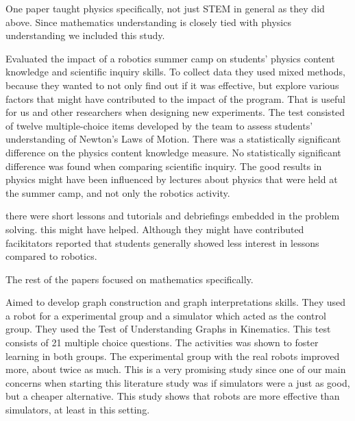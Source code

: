 \bigskip\noindent
One paper taught physics specifically, not just STEM in general as they did above. Since mathematics understanding is closely tied with physics understanding we included this study.

\bigskip\noindent
\cite{williams2007acquisition} Evaluated the impact of a robotics summer camp on students’ physics content knowledge and scientific inquiry skills. To collect data they used mixed methods, because they wanted to not only find out if it was effective, but explore various factors that might have contributed to the impact of the program. That is useful for us and other researchers when designing new experiments. The test consisted of twelve multiple-choice items developed by the team to assess students’ understanding of Newton’s Laws of Motion. There was a statistically significant difference on the physics content knowledge measure. No statistically significant difference was found when comparing scientific inquiry. The good results in physics might have been influenced by lectures about physics that were held at the summer camp, and not only the robotics activity. 

\bigskip\noindent
\cite{williams2007acquisition} there were short lessons and tutorials and debriefings embedded in the problem solving. this might have helped. Although they might have contributed facikitators reported that students generally showed less interest in lessons compared to robotics. 

\bigskip\noindent
The rest of the papers focused on mathematics specifically\cite{mitnik2009collaborative, norton2004using, lindh2007does, silk2011resources}.

\bigskip\noindent
\cite{mitnik2009collaborative} Aimed to develop graph construction and graph interpretations skills. They used a robot for a experimental group and a simulator which acted as the control group. They used the Test of Understanding Graphs in Kinematics. This test consists of 21 multiple choice questions. The activities was shown to foster learning in both groups. The experimental group with the real robots improved more, about twice as much. This is a very promising study since one of our main concerns when starting this literature study was if simulators were a just as good, but a cheaper alternative. This study shows that robots are more effective than simulators, at least in this setting. 

